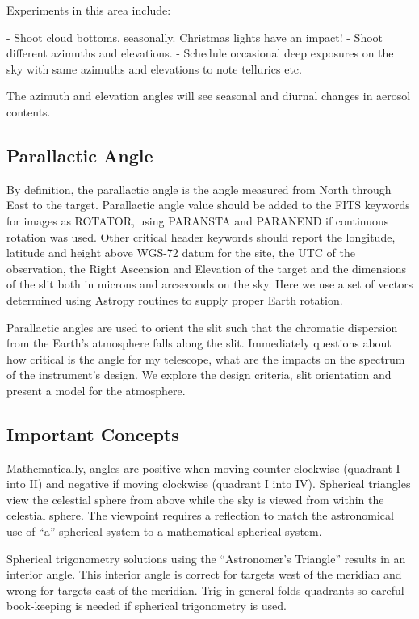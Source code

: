 \documentclass[letter,11pt,oneside]{article}
\begin{document}
Experiments in this area include:

- Shoot cloud bottoms, seasonally. Christmas lights have an impact!
- Shoot different azimuths and elevations.
- Schedule occasional deep exposures on the sky with same azimuths and elevations
  to note tellurics etc.

The azimuth and elevation angles will see seasonal and diurnal
changes in aerosol contents.


\subsection{Parallactic Angle}

By definition, the parallactic angle is the angle measured from North
through East to the target. Parallactic angle value should be added to
the FITS keywords for images as ROTATOR, using PARANSTA and PARANEND
if continuous rotation was used.  Other critical header keywords
should report the longitude, latitude and height above WGS-72
\cite{needed} datum for the site, the UTC of the observation, the
Right Ascension and Elevation of the target and the dimensions of the
slit both in microns and arcseconds on the sky. Here we use a set of
vectors determined using Astropy routines to supply proper Earth
rotation.

Parallactic angles are used to orient the slit such that the chromatic
dispersion from the Earth's atmosphere falls along the
slit. Immediately questions about how critical is the angle for my
telescope, what are the impacts on the spectrum of the instrument's
design. We explore the design criteria, slit orientation and present a
model for the atmosphere.

\subsection{Important Concepts}

Mathematically, angles are positive when moving counter-clockwise
(quadrant I into II) and negative if moving clockwise (quadrant I into
IV). Spherical triangles view the celestial sphere from above while
the sky is viewed from within the celestial sphere. The viewpoint
requires a reflection to match the astronomical use of ``a'' spherical
system to a mathematical spherical system.

Spherical trigonometry solutions using the ``Astronomer's Triangle'' 
results in an interior angle. This interior angle is correct for
targets west of the meridian and wrong for targets east of the meridian.
Trig in general folds quadrants so careful book-keeping is needed
if spherical trigonometry is used.
\end{document}

